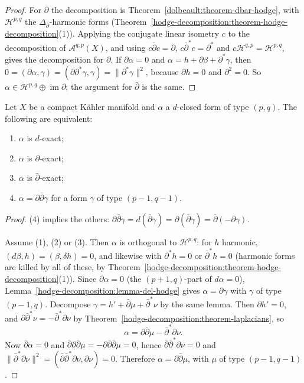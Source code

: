 \begin{proof}
For $\bar\partial$ the decomposition is Theorem~\ref{dolbeault:theorem-dbar-hodge}, with $\mathcal{H}^{p,q}$ the $\Delta_{\bar\partial}$-harmonic
forms (Theorem~\ref{hodge-decomposition:theorem-hodge-decomposition}(1)). Applying the conjugate linear isometry $c$ to the decomposition
of $\mathcal{A}^{q,p}(X)$, and using $c\bar\partial c = \partial$, $c\bar\partial^*c = \partial^*$ and $c\mathcal{H}^{q,p} = \mathcal{H}^{p,q}$, gives
the decomposition for $\partial$. If $\partial\alpha = 0$ and $\alpha = h + \partial\beta + \partial^*\gamma$, then
$0 = (\partial\alpha, \gamma) = (\partial\partial^*\gamma, \gamma) = \|\partial^*\gamma\|^2$, because $\partial h = 0$ and $\partial^2 = 0$. So
$\alpha \in \mathcal{H}^{p,q} \oplus \operatorname{im}\partial$; the argument for $\bar\partial$ is the same.
\end{proof}

\begin{theorem}\label{hodge-decomposition:theorem-ddbar-lemma}
Let $X$ be a compact K\"ahler manifold and $\alpha$ a $d$-closed form of type $(p,q)$. The following are equivalent:
\begin{enumerate}
\item $\alpha$ is $d$-exact;
\item $\alpha$ is $\partial$-exact;
\item $\alpha$ is $\bar\partial$-exact;
\item $\alpha = \partial\bar\partial\gamma$ for a form $\gamma$ of type $(p-1, q-1)$.
\end{enumerate}
\end{theorem}

\begin{proof}
(4) implies the others: $\partial\bar\partial\gamma = d(\bar\partial\gamma) = \partial(\bar\partial\gamma) = \bar\partial(-\partial\gamma)$.

Assume (1), (2) or (3). Then $\alpha$ is orthogonal to $\mathcal{H}^{p,q}$: for $h$ harmonic, $(d\beta, h) = (\beta, \delta h) = 0$, and
likewise with $\partial^*h = 0$ or $\bar\partial^*h = 0$ (harmonic forms are killed by all of these, by
Theorem~\ref{hodge-decomposition:theorem-hodge-decomposition}(1)). Since $\partial\alpha = 0$ (the $(p+1,q)$-part of $d\alpha = 0$),
Lemma~\ref{hodge-decomposition:lemma-del-hodge} gives $\alpha = \partial\gamma$ with $\gamma$ of type $(p-1,q)$. Decompose
$\gamma = h' + \bar\partial\mu + \bar\partial^*\nu$ by the same lemma. Then $\partial h' = 0$, and
$\partial\bar\partial^*\nu = -\bar\partial^*\partial\nu$ by Theorem~\ref{hodge-decomposition:theorem-laplacians}, so
\[
\alpha = \partial\bar\partial\mu - \bar\partial^*\partial\nu .
\]
Now $\bar\partial\alpha = 0$ and $\bar\partial\partial\bar\partial\mu = -\partial\bar\partial\bar\partial\mu = 0$, hence
$\bar\partial\bar\partial^*\partial\nu = 0$ and $\|\bar\partial^*\partial\nu\|^2 = (\bar\partial\bar\partial^*\partial\nu, \partial\nu) = 0$. Therefore
$\alpha = \partial\bar\partial\mu$, with $\mu$ of type $(p-1, q-1)$.
\end{proof}

